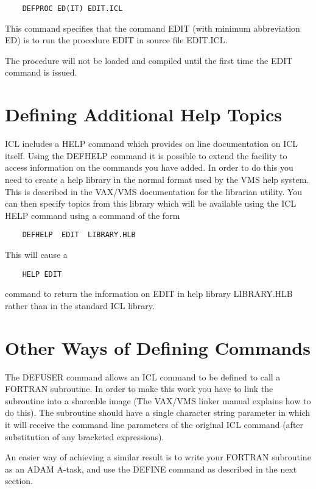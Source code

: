 \documentclass[twoside,11pt]{report}
\newcommand{\xlabel}[1]{}
\begin{document}
\begin{verbatim}
    DEFPROC ED(IT) EDIT.ICL
\end{verbatim}

This command specifies that the command EDIT (with minimum abbreviation
ED) is to run the procedure EDIT in source file EDIT.ICL.

The procedure will not be loaded and compiled until the first time the
EDIT command is issued.

\section{\xlabel{defining_additional_help_topics}Defining Additional Help Topics}

ICL includes a HELP command which provides on line documentation on ICL
itself. Using the DEFHELP command it is possible to extend the facility
to access information on the commands you have added. In order to do this
you need to create a help library in the normal format used by the VMS
help system. This is described in the VAX/VMS documentation for the librarian
utility. You can then specify topics from this library which will be
available using the ICL HELP command using a command of the form
\begin{verbatim}
    DEFHELP  EDIT  LIBRARY.HLB
\end{verbatim}
This will cause a
\begin{verbatim}
    HELP EDIT
\end{verbatim}
command to return the information on EDIT in help library LIBRARY.HLB rather
than in the standard ICL library.

\section{\xlabel{other_ways_of_defining_commands}Other Ways of Defining Commands}

The DEFUSER command allows an ICL command to be defined to call a FORTRAN
subroutine. In order to make this work you have to link the subroutine into
a shareable image (The VAX/VMS linker manual explains how to do this). The
subroutine should have a single character string parameter in which it will
receive the command line parameters of the original ICL command (after
substitution of any bracketed expressions).

An easier way of achieving a similar result is to write your FORTRAN
subroutine as an ADAM A-task, and use the DEFINE command as described in
the next section.
\end{document}
